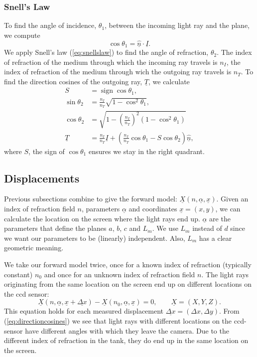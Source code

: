 \documentclass{article}
\DeclareMathOperator{\sign}{sign}
\begin{document}
\subsubsection{Snell's Law}
To find the angle of incidence, $\theta_1$, between the incoming light ray and the plane, we compute
\begin{equation}
	\cos \theta_1 = \underline{\hat{n}} \cdot \underline{I}.
\end{equation}
We apply Snell's law (\ref{eq:snellslaw}) to find the angle of refraction, $\theta_2$. The index of refraction of the medium through which the incoming ray travels is $n_I$, the index of refraction of the medium through wich the outgoing ray travels is $n_T$. To find the direction cosines of the outgoing ray, $\underline{T}$, we calculate 
\begin{align}
	S &= \sign \cos \theta_1, \\
	\sin \theta_2 &= \frac{n_I}{n_T} \sqrt{1-\cos^2 \theta_1}, \\
	\cos \theta_2 &= \sqrt{1-\left(\frac{n_I}{n_T}\right)^2(1-\cos^2 \theta_1)} \\
	\underline{T} &= \frac{n_I}{n_T} \underline{I} + \left(\frac{n_I}{n_T} \cos \theta_1 - S \cos\theta_2\right)\underline{\hat{n}},	
\end{align}
where $S$, the sign of $\cos\theta_1$ ensures we stay in the right quadrant.

\subsection{Displacements}
Previous subsections combine to give the forward model: $\underline{X}(n,\underline{\alpha}, \underline{x})$. Given an index of refraction field $n$, parameters $\underline{\alpha}$ and coordinates $\underline{x} = (x,y)$, we can calculate the location on the screen where the light rays end up. $\underline{\alpha}$ are the parameters that define the planes $a$, $b$, $c$ and $L_m$. We use $L_m$ instead of $d$ since we want our parameters to be (linearly) independent. Also, $L_m$ has a clear geometric meaning.

We take our forward model twice, once for a known index of refraction (typically constant) $n_0$ and once for an unknown index of refraction field $n$. The light rays originating from the same location on the screen end up on different locations on the ccd sensor:
\begin{equation}
\label{eq:ForwardModel}
	 \underline{X}(n, \underline{\alpha}, \underline{x}+\underline{\Delta x}) - \underline{X}(n_0, \underline{\alpha}, \underline{x}) = 0, \qquad \underline{X} = (X, Y, Z).
\end{equation}
This equation holds for each measured displacement $\underline{\Delta x} = (\Delta x, \Delta y)$. From (\ref{eq:directioncosines}) we see that light rays with different locations on the ccd-sensor have different angles with which they leave the camera. Due to the different index of refraction in the tank, they do end up in the same location on the screen.
\end{document}
